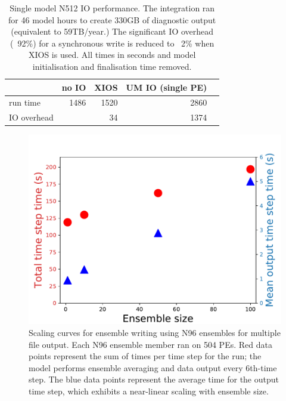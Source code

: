 \documentclass[twocolumn, 5p, times]{elsarticle}
\begin{document}
\begin{table}
	\begin{center}
	\begin{tabular}{|l|r|r|r|r}
		\hline
		 & no IO & XIOS & UM IO (single PE) \\
		\hline
		run time     & 1486 & 1520 & 2860\\
                IO overhead  &     & 34  & 1374\\
		\hline
	\end{tabular}
	\caption{Single model N512 IO performance. The integration ran for 46 model hours to create 330GB of diagnostic output (equivalent to 59TB/year.) The significant IO overhead (~92\%) for a synchronous write is reduced to ~2\% when XIOS is used. All times in seconds and model initialisation and finalisation time removed.  }
        \label{table3}
	\end{center}
\end{table}

\begin{figure}
	\includegraphics[width=\columnwidth]{figures/ens-n96.pdf}
	\caption{Scaling curves for ensemble writing using N96 ensembles for multiple file output. Each N96 ensemble member ran on 504 PEs. Red data points represent the sum of times per time step for the run; the model performs ensemble averaging and data output every 6th-time step. The blue data points represent the average time for the output time step, which exhibits a near-linear scaling with ensemble size.}
        \label{first-ensemble-runs-n96}
\end{figure}
\end{document}
